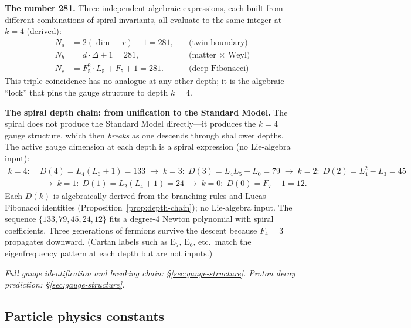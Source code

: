 \documentclass[12pt,a4paper]{article}
\begin{document}
\medskip
\noindent\textbf{The number 281.}\; Three independent algebraic expressions, each built from different combinations of spiral invariants, all evaluate to the same integer at $k = 4$ (derived):
\begin{align}
N_a &= 2(\dim + r) + 1 = 281, &\quad \text{(twin boundary)} \\
N_b &= d \cdot \Delta + 1 = 281, &\quad \text{(matter $\times$ Weyl)} \\
N_c &= F_5^2 \cdot L_5 + F_5 + 1 = 281. &\quad \text{(deep Fibonacci)}
\end{align}
This triple coincidence has no analogue at any other depth; it is the algebraic ``lock'' that pins the gauge structure to depth $k = 4$.

\medskip
\noindent\textbf{The spiral depth chain: from unification to the Standard Model.}\;
The spiral does not produce the Standard Model directly---it produces the $k = 4$ gauge structure, which then \emph{breaks} as one descends through shallower depths. The active gauge dimension at each depth is a spiral expression (no Lie-algebra input):
\begin{equation}
\label{eq:spiral-depth-chain}
\begin{aligned}
k{=}4:\; & D(4) = L_4(L_6{+}1) = 133 \;\to\; k{=}3:\; D(3) = L_4 L_5 {+} L_0 = 79 \;\to\; k{=}2:\; D(2) = L_4^2 {-} L_3 = 45 \\
&\;\to\; k{=}1:\; D(1) = L_2(L_4{+}1) = 24 \;\to\; k{=}0:\; D(0) = F_7 {-} 1 = 12.
\end{aligned}
\end{equation}
Each $D(k)$ is algebraically derived from the branching rules and Lucas--Fibonacci identities (Proposition~\ref{prop:depth-chain}); no Lie-algebra input. The sequence $\{133, 79, 45, 24, 12\}$ fits a degree-4 Newton polynomial with spiral coefficients. Three generations of fermions survive the descent because $F_4 = 3$ propagates downward. (Cartan labels such as E$_7$, E$_6$, etc.\ match the eigenfrequency pattern at each depth but are not inputs.)

\noindent\textit{Full gauge identification and breaking chain: \S\ref{sec:gauge-structure}.  Proton decay prediction: \S\ref{sec:gauge-structure}.}



\subsection{Particle physics constants}
\label{sec:trunk-particles}
\end{document}
